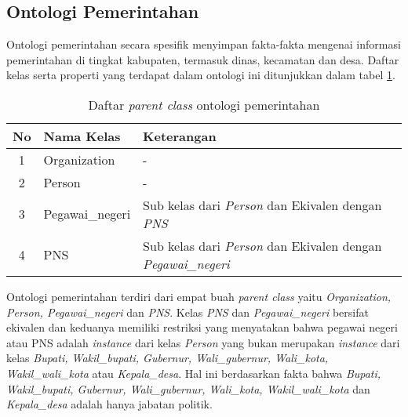 \subsection{Ontologi Pemerintahan}
Ontologi pemerintahan secara spesifik menyimpan fakta-fakta mengenai informasi pemerintahan di tingkat kabupaten, termasuk dinas, kecamatan dan desa. Daftar kelas serta properti yang terdapat dalam ontologi ini ditunjukkan dalam tabel \ref{table:parent_class_onogov}.

\begin{table}[hb]
	\caption{Daftar \emph{parent class} ontologi pemerintahan}
	\label{table:parent_class_onogov}
	\begin{tabularx}{\textwidth}{|c|l|X|}
		\hline
			\textbf{No} & \textbf{Nama Kelas} & \textbf{Keterangan} \\
		\hline
			1 & Organization & - \\
		\hline
			2 & Person & - \\
		\hline
			3 & Pegawai\_negeri & Sub kelas dari \emph{Person} dan Ekivalen dengan \emph{PNS} \\
		\hline
			4 & PNS & Sub kelas dari \emph{Person} dan Ekivalen dengan \emph{Pegawai\_negeri} \\
		\hline
	\end{tabularx}
\end{table}

Ontologi pemerintahan terdiri dari empat buah \emph{parent class} yaitu \emph{Organization, Person, Pegawai\_negeri} dan \emph{PNS}. Kelas \emph{PNS} dan \emph{Pegawai\_negeri} bersifat ekivalen dan keduanya memiliki restriksi yang menyatakan bahwa pegawai negeri atau PNS adalah \emph{instance} dari kelas \emph{Person} yang bukan merupakan \emph{instance} dari kelas \emph{Bupati, Wakil\_bupati, Gubernur, Wali\_gubernur, Wali\_kota, Wakil\_wali\_kota} atau \emph{Kepala\_desa}. Hal ini berdasarkan fakta bahwa \emph{Bupati, Wakil\_bupati, Gubernur, Wali\_gubernur, Wali\_kota, Wakil\_wali\_kota} dan \emph{Kepala\_desa} adalah hanya jabatan politik.

